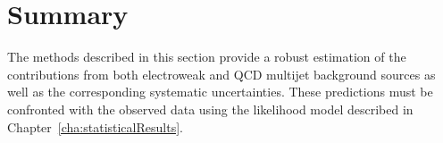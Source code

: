 \section{Summary}

The methods described in this section provide a robust estimation of the 
contributions from both electroweak and QCD multijet background sources
as well as the corresponding systematic uncertainties. These
predictions must be confronted with the observed data using the 
likelihood model described
in Chapter~\ref{cha:statisticalResults}.



